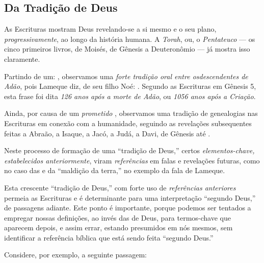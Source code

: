     \subsection{Da Tradição de Deus}

    As Escrituras mostram Deus revelando-se a si mesmo e o seu plano, \emph{progressivamente}, ao longo da  história  humana.  A
    \emph{Torah}, ou, o \emph{Pentateuco} --- os cinco primeiros livros, de Moisés, de Gênesis a Deuteronômio --- já mostra isso
    claramente.

    Partindo de um: , observamos uma \emph{forte tradição oral entre osdescendentes de Adão}, pois  Lameque  diz,
    de seu filho Noé: . Segundo as Escrituras em Gênesis 5, esta frase foi dita \emph{126
    anos após a morte de Adão}, ou \emph{1056 anos após a Criação}.

    Ainda, por causa de um \emph{prometido} ,  observamos  uma  tradição  de
    genealogias nas Escrituras em conexão com a humanidade, seguindo as revelações subsequentes feitas a  Abraão,  a  Isaque,  a
    Jacó, a Judá, a Davi, de Gênesis até .

    Neste processo de formação de uma ``tradição de Deus,'' certos \emph{elementos-chave,  estabelecidos  anteriormente},  viram
    \emph{referências} em falas e revelações futuras, como no caso das  e da ``maldição da terra,''  no  exemplo
    da fala de Lameque.

    Esta crescente ``tradição de Deus,'' com forte uso de \emph{referências anteriores} permeia as Escrituras e  é  determinante
    para uma interpretação ``segundo Deus,'' de passagens adiante. Este ponto  é  importante,  porque  podemos  ser  tentados  a
    empregar nossas definições, ao invés das de Deus, para termos-chave que aparecem depois, e assim errar,  estando  presumidos
    em nós mesmos, sem identificar a referência bíblica que está sendo feita ``segundo Deus.''

    Considere, por exemplo, a seguinte passagem:


